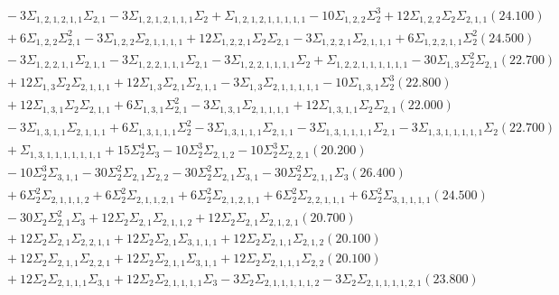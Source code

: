 \documentclass[12pt]{article}
\begin{document}
\begin{landscape}
\begin{align*}
		&\quad\quad -3\Sigma_{1,2,1,2,1,1}\Sigma_{2,1}-3\Sigma_{1,2,1,2,1,1,1}\Sigma_{2}+\Sigma_{1,2,1,2,1,1,1,1,1}-10\Sigma_{1,2,2}\Sigma_{2}^{3}+12\Sigma_{1,2,2}\Sigma_{2}\Sigma_{2,1,1}(24.100) \\ 
		&\quad\quad +6\Sigma_{1,2,2}\Sigma_{2,1}^{2}-3\Sigma_{1,2,2}\Sigma_{2,1,1,1,1}+12\Sigma_{1,2,2,1}\Sigma_{2}\Sigma_{2,1}-3\Sigma_{1,2,2,1}\Sigma_{2,1,1,1}+6\Sigma_{1,2,2,1,1}\Sigma_{2}^{2}(24.500) \\ 
		&\quad\quad -3\Sigma_{1,2,2,1,1}\Sigma_{2,1,1}-3\Sigma_{1,2,2,1,1,1}\Sigma_{2,1}-3\Sigma_{1,2,2,1,1,1,1}\Sigma_{2}+\Sigma_{1,2,2,1,1,1,1,1,1}-30\Sigma_{1,3}\Sigma_{2}^{2}\Sigma_{2,1}(22.700) \\ 
		&\quad\quad +12\Sigma_{1,3}\Sigma_{2}\Sigma_{2,1,1,1}+12\Sigma_{1,3}\Sigma_{2,1}\Sigma_{2,1,1}-3\Sigma_{1,3}\Sigma_{2,1,1,1,1,1}-10\Sigma_{1,3,1}\Sigma_{2}^{3}(22.800) \\ 
		&\quad\quad +12\Sigma_{1,3,1}\Sigma_{2}\Sigma_{2,1,1}+6\Sigma_{1,3,1}\Sigma_{2,1}^{2}-3\Sigma_{1,3,1}\Sigma_{2,1,1,1,1}+12\Sigma_{1,3,1,1}\Sigma_{2}\Sigma_{2,1}(22.000) \\ 
		&\quad\quad -3\Sigma_{1,3,1,1}\Sigma_{2,1,1,1}+6\Sigma_{1,3,1,1,1}\Sigma_{2}^{2}-3\Sigma_{1,3,1,1,1}\Sigma_{2,1,1}-3\Sigma_{1,3,1,1,1,1}\Sigma_{2,1}-3\Sigma_{1,3,1,1,1,1,1}\Sigma_{2}(22.700) \\ 
		&\quad\quad +\Sigma_{1,3,1,1,1,1,1,1,1}+15\Sigma_{2}^{4}\Sigma_{3}-10\Sigma_{2}^{3}\Sigma_{2,1,2}-10\Sigma_{2}^{3}\Sigma_{2,2,1}(20.200) \\ 
		&\quad\quad -10\Sigma_{2}^{3}\Sigma_{3,1,1}-30\Sigma_{2}^{2}\Sigma_{2,1}\Sigma_{2,2}-30\Sigma_{2}^{2}\Sigma_{2,1}\Sigma_{3,1}-30\Sigma_{2}^{2}\Sigma_{2,1,1}\Sigma_{3}(26.400) \\ 
		&\quad\quad +6\Sigma_{2}^{2}\Sigma_{2,1,1,1,2}+6\Sigma_{2}^{2}\Sigma_{2,1,1,2,1}+6\Sigma_{2}^{2}\Sigma_{2,1,2,1,1}+6\Sigma_{2}^{2}\Sigma_{2,2,1,1,1}+6\Sigma_{2}^{2}\Sigma_{3,1,1,1,1}(24.500) \\ 
		&\quad\quad -30\Sigma_{2}\Sigma_{2,1}^{2}\Sigma_{3}+12\Sigma_{2}\Sigma_{2,1}\Sigma_{2,1,1,2}+12\Sigma_{2}\Sigma_{2,1}\Sigma_{2,1,2,1}(20.700) \\ 
		&\quad\quad +12\Sigma_{2}\Sigma_{2,1}\Sigma_{2,2,1,1}+12\Sigma_{2}\Sigma_{2,1}\Sigma_{3,1,1,1}+12\Sigma_{2}\Sigma_{2,1,1}\Sigma_{2,1,2}(20.100) \\ 
		&\quad\quad +12\Sigma_{2}\Sigma_{2,1,1}\Sigma_{2,2,1}+12\Sigma_{2}\Sigma_{2,1,1}\Sigma_{3,1,1}+12\Sigma_{2}\Sigma_{2,1,1,1}\Sigma_{2,2}(20.100) \\ 
		&\quad\quad +12\Sigma_{2}\Sigma_{2,1,1,1}\Sigma_{3,1}+12\Sigma_{2}\Sigma_{2,1,1,1,1}\Sigma_{3}-3\Sigma_{2}\Sigma_{2,1,1,1,1,1,2}-3\Sigma_{2}\Sigma_{2,1,1,1,1,2,1}(23.800) \\ 

\end{align*}
\end{landscape}
\end{document}
